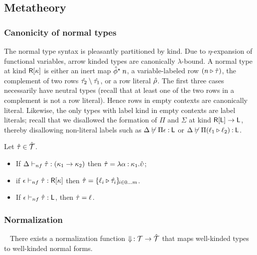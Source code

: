 \documentclass[sigplan,10pt,review]{acmart}\settopmatter{printfolios=true,printccs=false,printacmref=false}
\begin{document}
\subsection{Metatheory}
\label{sec:metatheory-summary}

\subsubsection{Canonicity of normal types}

The normal type syntax is pleasantly partitioned by kind. Due to $\eta$-expansion of functional variables, arrow kinded types are canonically $\lambda$-bound. A normal type at kind $\RowK \kappa$ is either an inert map $\hat{\phi}^{\TypeK} \, n$, a variable-labeled row $(\LabTy n \Normal \tau)$, the complement of two rows $\Normal {\tau_{2}} \Compl \Normal {\tau_{1}}$, or a row literal $\Normal \rho$. The first three cases necessarily have neutral types (recall that at least one of the two rows in a complement is not a row literal). Hence rows in empty contexts are canonically literal. Likewise, the only types with label kind in empty contexts are label literals; recall that we disallowed the formation of $\Pi$ and $\Sigma$ at kind $\RowK \LabK \to \LabK$, thereby disallowing non-literal labels such as $\Delta \not\vdash \Pi \epsilon \co \LabK$ or $\Delta \not\vdash \Pi (\LabTy {\ell_{1}} {\ell_{2}}) \co \LabK$.

\begin{theorem}[Canonicity]
  Let $\Normal\tau \in \NormalTypes$.
  \begin{itemize}
    \item If $\KindJNF \Delta {\Normal\tau} {(\kappa_{1} \to \kappa_{2})}$ then $\Normal\tau = {\lambda \alpha \co \kappa_{1}. \Normal\upsilon}$;
    \item if $\KindJNF \epsilon {\Normal\tau} {\RowK \kappa}$ then $\Normal\tau =  \RowIx i 0 m {\LabTy {\ell_i} {\Normal{\tau_i}}}$.
    \item If $\KindJNF \epsilon {\Normal\tau} \LabK$, then $\Normal\tau = \ell$.
  \end{itemize}
\end{theorem}
\subsubsection{Normalization}
\begin{theorem}[Normalization] ~
  There exists a normalization function $\Norm\, : \Types \to \NormalTypes$ that maps well-kinded types to well-kinded normal forms.
\end{theorem}
\end{document}
